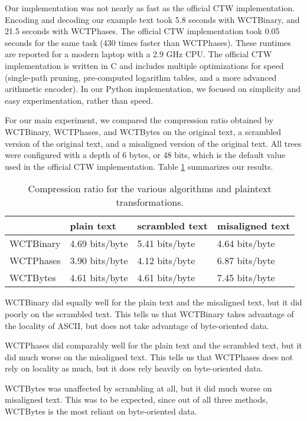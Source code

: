 \documentclass[11pt]{scrartcl}
\begin{document}
Our implementation was not nearly as fast as the official CTW implementation.
Encoding and decoding our example text took 5.8 seconds with WCTBinary, and
21.5 seconds with WCTPhases. The official CTW implementation took 0.05 seconds
for the same task (430 times faster than WCTPhases). These runtimes are
reported for a modern laptop with a 2.9 GHz CPU. The official CTW
implementation is written in C and includes multiple optimizations for speed
(single-path pruning, pre-computed logarithm tables, and a more advanced
arithmetic encoder). In our Python implementation, we focused on simplicity and
easy experimentation, rather than speed.

For our main experiment, we compared the compression ratio obtained by
WCTBinary, WCTPhases, and WCTBytes on the original text, a scrambled version of
the original text, and a misaligned version of the original text. All trees
were configured with a depth of 6 bytes, or 48 bits, which is the default value
used in the official CTW implementation. Table \ref{tab:results} summarizes our
results.

\begin{table}[h!]
    \centering
    \begin{tabular}{l|lll}
        & plain text & scrambled text & misaligned text \\
        \hline
        WCTBinary & 4.69 bits/byte & 5.41 bits/byte & 4.64 bits/byte \\
        WCTPhases & 3.90 bits/byte & 4.12 bits/byte & 6.87 bits/byte \\
        WCTBytes  & 4.61 bits/byte & 4.61 bits/byte & 7.45 bits/byte \\
    \end{tabular}
    \caption{Compression ratio for the various algorithms and plaintext
    transformations.}
    \label{tab:results}
\end{table}

WCTBinary did equally well for the plain text and the misaligned text, but it
did poorly on the scrambled text. This tells us that WCTBinary takes advantage
of the locality of ASCII, but does not take advantage of byte-oriented data.

WCTPhases did comparably well for the plain text and the scrambled text, but it
did much worse on the misaligned text. This tells us that WCTPhases does not
rely on locality as much, but it does rely heavily on byte-oriented data.

WCTBytes was unaffected by scrambling at all, but it did much worse on
misaligned text. This was to be expected, since out of all three methods,
WCTBytes is the most reliant on byte-oriented data.
\end{document}
